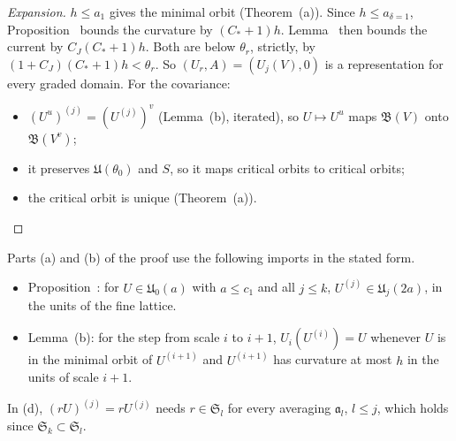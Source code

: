 \begin{proof}[Expansion]
$h\le a_1$ gives the minimal orbit (Theorem~(a)). Since $h\le a_{\delta=1}$, Proposition~ bounds the curvature by $(C_*+1)h$. Lemma~ then bounds the current by $C_J(C_*+1)h$. Both are below $\theta_r$, strictly, by $(1+C_J)(C_*+1)h<\theta_r$. So $(U_r,A)=(U_j(V),0)$ is a representation for every graded domain. For the covariance:
\begin{itemize}
\item $(U^u)^{(j)}=(U^{(j)})^v$ (Lemma~(b), iterated), so $U\mapsto U^u$ maps $\mathfrak B(V)$ onto $\mathfrak B(V^v)$;
\item it preserves $\mathfrak U(\theta_0)$ and $S$, so it maps critical orbits to critical orbits;
\item the critical orbit is unique (Theorem~(a)).
\end{itemize}
\end{proof}

\begin{detail}\label{xb:d-later}
Parts (a) and (b) of the proof use the following imports in the stated form.
\begin{itemize}
\item Proposition~: for $U\in\mathfrak U_0(a)$ with $a\le c_1$ and all $j\le k$, $U^{(j)}\in\mathfrak U_j(2a)$, in the units of the fine lattice.
\item Lemma~(b): for the step from scale $i$ to $i+1$, $U_i(U^{(i)})=U$ whenever $U$ is in the minimal orbit of $U^{(i+1)}$ and $U^{(i+1)}$ has curvature at most $h$ in the units of scale $i+1$.
\end{itemize}
In (d), $(rU)^{(j)}=rU^{(j)}$ needs $r\in\mathfrak S_l$ for every averaging $\mathfrak a_l$, $l\le j$, which holds since $\mathfrak S_k\subset\mathfrak S_l$.
\end{detail}

